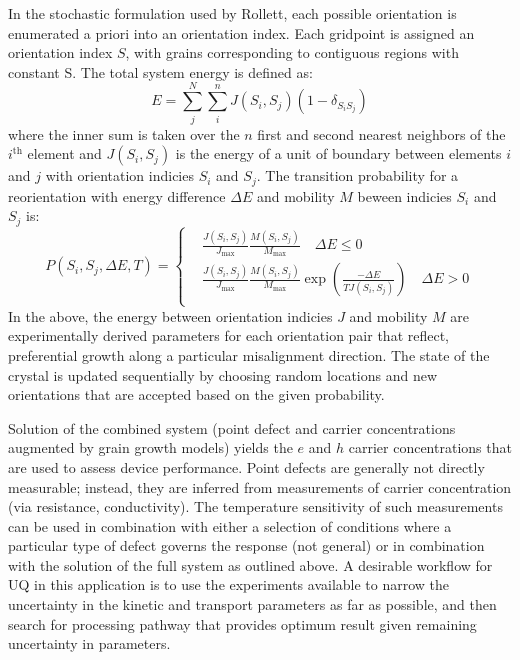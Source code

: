 \documentclass[11pt]{article}
\begin{document}
In the stochastic formulation used by Rollett, each possible orientation is enumerated a priori into an orientation index. Each gridpoint is assigned an orientation index $S$, with grains corresponding to contiguous regions with constant S. The total system energy is defined as:
\begin{equation}
  \label{eq:mcgrainE}
  E = \sum_j^N \sum_i^n J(S_i, S_j) (1-\delta_{S_iS_j})
\end{equation}
where the inner sum is taken over the $n$ first and second nearest neighbors of the $i^\mathrm{th}$ element and $J(S_i,S_j)$ is the energy of a unit of boundary between elements $i$ and $j$ with orientation indicies $S_i$ and $S_j$. The transition probability for a reorientation with energy difference $\Delta E$ and mobility $M$ beween indicies $S_i$ and $S_j$ is:
\begin{equation}
  \label{eq:mcgrainP}
  P( S_i, S_j, \Delta E, T) = \left\{ \begin{aligned}
      & \frac{J(S_i,S_j)}{J_\mathrm{max}} \frac{ M(S_i, S_j) }{M_\mathrm{max}}  \quad \Delta E \le 0 \\
      & \frac{J(S_i,S_j)}{J_\mathrm{max}} \frac{ M(S_i, S_j) }{M_\mathrm{max}} \exp \left( \frac{-\Delta E}{TJ(S_i,S_j)}\right)  \quad \Delta E > 0 \\
      \end{aligned}
      \right. 
\end{equation}
In the above, the energy between orientation indicies $J$ and mobility $M$ are experimentally derived parameters for each orientation pair that reflect, preferential growth along a particular misalignment direction. The state of the crystal is updated sequentially by choosing random locations and new orientations that are accepted based on the given probability. 




  Solution of the combined system (point defect and carrier
  concentrations augmented by grain growth models) yields the $e$ and
  $h$ carrier concentrations that are used to assess device
  performance. Point defects are generally not directly measurable;
  instead, they are inferred from measurements of carrier
  concentration (via resistance, conductivity). The temperature
  sensitivity of such measurements can be used in combination with
  either a selection of conditions where a particular type of defect
  governs the response (not general) or in combination with the
  solution of the full system as outlined above. A desirable workflow
  for UQ in this application is to use the experiments available to narrow
  the uncertainty in the kinetic and transport parameters as far as
  possible, and then search for processing pathway that provides
  optimum result given remaining uncertainty in parameters.
\end{document}
